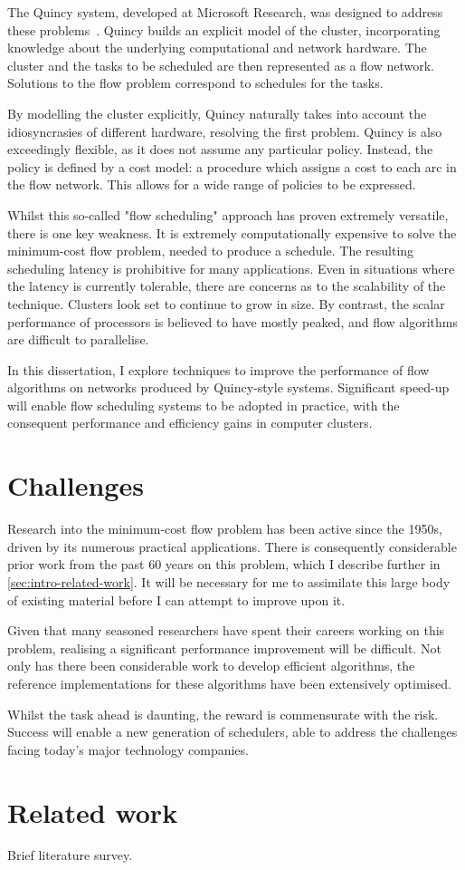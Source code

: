 The Quincy system, developed at Microsoft Research, was designed to address these problems~\cite{Isard:2009}. Quincy builds an explicit model of the cluster, incorporating knowledge about the underlying computational and network hardware. The cluster and the tasks to be scheduled are then represented as a flow network. Solutions to the flow problem correspond to schedules for the tasks.

By modelling the cluster explicitly, Quincy naturally takes into account the idiosyncrasies of different hardware, resolving the first problem. Quincy is also exceedingly flexible, as it does not assume any particular policy. Instead, the policy is defined by a cost model: a procedure which assigns a cost to each arc in the flow network. This allows for a wide range of policies to be expressed.

Whilst this so-called "flow scheduling" approach has proven extremely versatile, there is one key weakness. It is extremely computationally expensive to solve the minimum-cost flow problem, needed to produce a schedule. The resulting scheduling latency is prohibitive for many applications. Even in situations where the latency is currently tolerable, there are concerns as to the scalability of the technique. Clusters look set to continue to grow in size. By contrast, the scalar performance of processors is believed to have mostly peaked, and flow algorithms are difficult to parallelise.

In this dissertation, I explore techniques to improve the performance of flow algorithms on networks produced by Quincy-style systems. Significant speed-up will enable flow scheduling systems to be adopted in practice, with the consequent performance and efficiency gains in computer clusters.

\section{Challenges} \label{sec:intro-challenges}
Research into the minimum-cost flow problem has been active since the 1950s, driven by its numerous practical applications. There is consequently considerable prior work from the past 60 years on this problem, which I describe further in \vref{sec:intro-related-work}. It will be necessary for me to assimilate this large body of existing material before I can attempt to improve upon it.

Given that many seasoned researchers have spent their careers working on this problem, realising a significant performance improvement will be difficult. Not only has there been considerable work to develop efficient algorithms, the reference implementations for these algorithms have been extensively optimised.

Whilst the task ahead is daunting, the reward is commensurate with the risk. Success will enable a new generation of schedulers, able to address the challenges facing today's major technology companies.

\section{Related work} \label{sec:intro-related-work}
Brief literature survey.